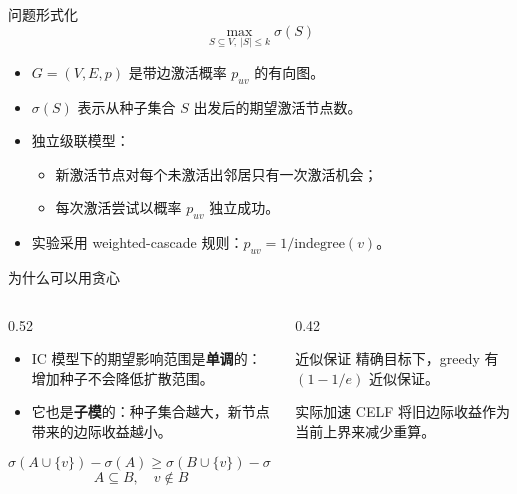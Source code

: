 \documentclass[UTF8, 10pt, aspectratio=169]{ctexbeamer}
\newcommand{\metricbox}[2]{%
    \begin{block}{#1}
        \centering\Large #2
    \end{block}
}
\begin{document}
\begin{frame}{问题形式化}
    \[
        \max_{S\subseteq V,\ |S|\leq k} \sigma(S)
    \]
    \begin{itemize}
        \item $G=(V,E,p)$ 是带边激活概率 $p_{uv}$ 的有向图。
        \item $\sigma(S)$ 表示从种子集合 $S$ 出发后的期望激活节点数。
        \item 独立级联模型：
        \begin{itemize}
            \item 新激活节点对每个未激活出邻居只有一次激活机会；
            \item 每次激活尝试以概率 $p_{uv}$ 独立成功。
        \end{itemize}
        \item 实验采用 weighted-cascade 规则：$p_{uv}=1/\mathrm{indegree}(v)$。
    \end{itemize}
\end{frame}

\begin{frame}{为什么可以用贪心}
    \begin{columns}[T,onlytextwidth]
        \begin{column}{0.52\linewidth}
            \begin{itemize}
                \item IC 模型下的期望影响范围是\textbf{单调}的：增加种子不会降低扩散范围。
                \item 它也是\textbf{子模}的：种子集合越大，新节点带来的边际收益越小。
            \end{itemize}
            \[
                \sigma(A\cup\{v\})-\sigma(A)
                \geq
                \sigma(B\cup\{v\})-\sigma(B)
            \]
            \[
                A\subseteq B,\quad v\notin B
            \]
        \end{column}
        \begin{column}{0.42\linewidth}
            \metricbox{近似保证}{精确目标下，greedy 有 $(1-1/e)$ 近似保证。}
            \metricbox{实际加速}{CELF 将旧边际收益作为当前上界来减少重算。}
        \end{column}
    \end{columns}
\end{frame}
\end{document}
